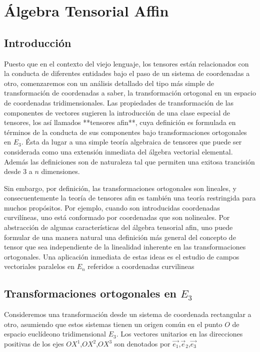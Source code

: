 
\setchapterpreamble[u]{\margintoc}
\chapter{Álgebra Tensorial Affin}

\section{Introducción}

Puesto que en el contexto del viejo lenguaje, los tensores están relacionados con la conducta de diferentes entidades bajo el paso de un sistema de coordenadas a otro, comenzaremos con un análisis detallado del tipo más simple de transformación de coordenadas a saber, la transformación ortogonal en un espacio de coordenadas tridimensionales. Las propiedades de transformación de las componentes de vectores sugieren la introducción de una clase especial de tensores, los así llamados  **tensores afin**, cuya definición es formulada en términos de la conducta de sus componentes bajo transformaciones ortogonales en $E_3$. Ésta da lugar a una simple teoría algebraica de tensores que puede ser considerada como una extensión inmediata del álgebra vectorial elemental. Además las definiciones son de naturaleza tal que permiten una exitosa trancisión desde 3 a $n$ dimensiones.

Sin embargo, por definición, las transformaciones ortogonales son lineales, y consecuentemente la teoría de tensores afin es también una teoría restringida para muchos propósitos. Por ejemplo, cuando son introducidas coordenadas curvilíneas, uno está conformado por coordenadas que son nolineales. Por abstracción de algunas características del álgebra tensorial afin, uno puede formular de una manera natural una definición más general del concepto de tensor que sea independiente de la linealidad inherente en las transformaciones ortogonales. Una aplicación inmediata de estas ideas es el estudio de campos vectoriales paralelos en $E_n$ referidos a coordenadas curvilineas

\section{Transformaciones ortogonales en $E_3$}

Consideremos una transformación desde un sistema de coordenada rectangular a otro, asumiendo que estos sistemas tienen un origen común en el punto $O$ de espacio euclídeono tridimensional $E_3$. Los vectores unitarios en las direcciones positivas de los ejes $OX^1$,$OX^2$,$OX^3$ son denotados por $\vec{e_1}$,$\vec{e}_2$,$\vec{e_3}$

